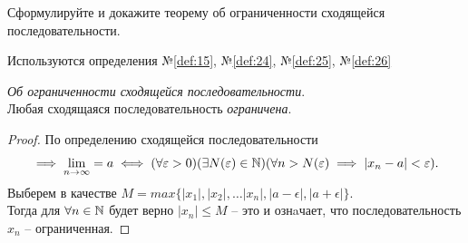 \begin{question}
    Сформулируйте и докажите теорему об ограниченности сходящейся последовательности.
\end{question}
\begin{used}
    Используются определения №\ref{def:15}, №\ref{def:24}, №\ref{def:25}, №\ref{def:26}
\end{used}
\begin{theorem}
  \textit{Об ограниченности сходящейся последовательности}. \\ 
  Любая сходящаяся последовательность \textit{ограничена}. 
\end{theorem}
\begin{proof}
    По определению сходящейся последовательности 
    \begin{gather*}
        \implies \lim_{n \to \infty} = a \iff (\forall \varepsilon > 0)(\exists N(\varepsilon)\in \mathbb{N})(\forall n > N(\varepsilon) \implies |x_{n} - a| < \varepsilon).
    \end{gather*}
    Выберем в качестве $M = max \{|x_{1}|, |x_2|, \ldots |x_n|, |a - \epsilon|, |a + \epsilon|\}$. \\
    Тогда для $\forall n \in \mathbb{N}$ будет верно $|x_{n}| \le M$ -- это и ознaчает, что последовательность $x_{n}$ -- ограниченная.
\end{proof}



